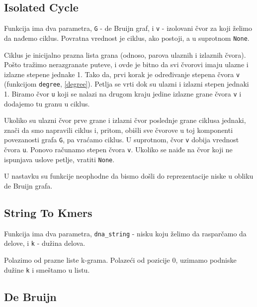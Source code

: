 


\subsection{Isolated Cycle}
\label{isolatedCycle}

Funkcija ima dva parametra, \texttt{G} - de Bruijn graf, i \texttt{v} - izolovani čvor za koji želimo da nađemo ciklus. Povratna vrednost je ciklus, ako postoji, a u suprotnom \texttt{None}.

Ciklus je inicijalno prazna lista grana (odnoso, parova ulaznih i izlaznih čvora). Pošto tražimo nerazgranate puteve, i ovde je bitno da svi čvorovi imaju ulazne i izlazne stepene jednake 1. Tako da, prvi korak je određivanje stepena čvora \texttt{v} (funkcijom \texttt{degree}, \ref{degree}). Petlja se vrti dok su ulazni i izlazni stepen jednaki 1. Biramo čvor \texttt{u} koji se nalazi na drugom kraju jedine izlazne grane čvora \texttt{v} i dodajemo tu granu u ciklus. 

Ukoliko su ulazni čvor prve grane i izlazni čvor poslednje grane ciklusa jednaki, znači da smo napravili ciklus i, pritom, obišli sve čvorove u toj komponenti povezanosti grafa \texttt{G}, pa vraćamo ciklus. U suprotnom, čvor \texttt{v} dobija vrednost čvora \texttt{u}. Ponovo računamo stepen čvora \texttt{v}. Ukoliko se naiđe na čvor koji ne ispunjava uslove petlje, vratiti \texttt{None}.



U nastavku su funkcije neophodne da bismo došli do reprezentacije niske u obliku de Bruijn grafa.


\subsection{String To Kmers}
\label{stringToKmers}

Funkcija ima dva parametra, \texttt{dna\_string} - nisku koju želimo da rasparčamo da delove, i \texttt{k} - dužina delova.

Polazimo od prazne liste k-grama. Polazeći od pozicije 0, uzimamo podniske dužine \texttt{k} i smeštamo u listu.  





\subsection{De Bruijn}

